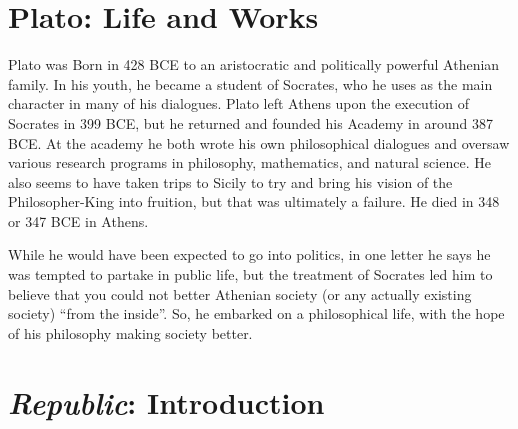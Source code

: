 \documentclass[oneside]{article}
\begin{document}
\thispagestyle{fancy}

\section*{Plato: Life and Works}

Plato was Born in 428 BCE to an aristocratic and politically powerful Athenian family. In his youth, he became a student of Socrates, who he uses as the main character in many of his dialogues. Plato left Athens upon the execution of Socrates in 399 BCE, but he returned and founded his Academy in around 387 BCE. At the academy he both wrote his own philosophical dialogues and oversaw various research programs in philosophy, mathematics, and natural science. He also seems to have taken trips to Sicily to try and bring his vision of the Philosopher-King into fruition, but that was ultimately a failure. He died in 348 or 347 BCE in Athens.

While he would have been expected to go into politics, in one letter he says he was tempted to partake in public life, but the treatment of Socrates led him to believe that you could not better Athenian society (or any actually existing society) ``from the inside''. So, he embarked on a philosophical life, with the hope of his philosophy making society better.



\section*{\emph{Republic}: Introduction}
\end{document}
